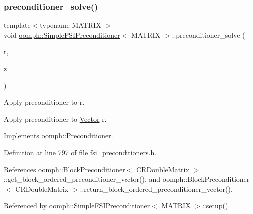 \subsubsection{\texorpdfstring{preconditioner\+\_\+solve()}{preconditioner\_solve()}}
{\footnotesize\ttfamily template$<$typename M\+A\+T\+R\+IX $>$ \\
void \hyperlink{classoomph_1_1SimpleFSIPreconditioner}{oomph\+::\+Simple\+F\+S\+I\+Preconditioner}$<$ M\+A\+T\+R\+IX $>$\+::preconditioner\+\_\+solve (\begin{DoxyParamCaption}\item[{const \hyperlink{classoomph_1_1DoubleVector}{Double\+Vector} \&}]{r,  }\item[{\hyperlink{classoomph_1_1DoubleVector}{Double\+Vector} \&}]{z }\end{DoxyParamCaption})\hspace{0.3cm}{\ttfamily [virtual]}}



Apply preconditioner to r. 

Apply preconditioner to \hyperlink{classoomph_1_1Vector}{Vector} r. 

Implements \hyperlink{classoomph_1_1Preconditioner_ace1199369e4465cd2b9a34884bb64ec8}{oomph\+::\+Preconditioner}.



Definition at line 797 of file fsi\+\_\+preconditioners.\+h.



References oomph\+::\+Block\+Preconditioner$<$ C\+R\+Double\+Matrix $>$\+::get\+\_\+block\+\_\+ordered\+\_\+preconditioner\+\_\+vector(), and oomph\+::\+Block\+Preconditioner$<$ C\+R\+Double\+Matrix $>$\+::return\+\_\+block\+\_\+ordered\+\_\+preconditioner\+\_\+vector().



Referenced by oomph\+::\+Simple\+F\+S\+I\+Preconditioner$<$ M\+A\+T\+R\+I\+X $>$\+::setup().

\mbox{\label{classoomph_1_1SimpleFSIPreconditioner_ab9c5875d7186cfb5c55cecb72bed50b3}} 
